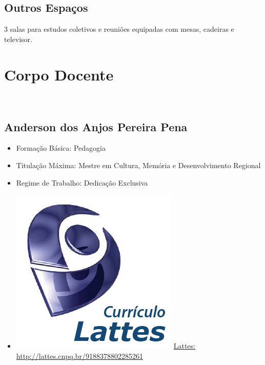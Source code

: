 \documentclass[11pt,fleqn]{book} %
\begin{document}
\section{Outros Espaços}

3 salas para estudos coletivos e reuniões equipadas com mesas, cadeiras e televisor.


\chapter{Corpo Docente}
\vspace{6em}
\begin{flushright}
	\textit{\textcolor{white}{Foto: Adriano Darosci}}
\end{flushright}
\vspace{12em}



\section{Anderson dos Anjos Pereira Pena}\label{AndersonPena}
\begin{itemize}
	\item Formação Básica: Pedagogia
	\item Titulação Máxima: Mestre em Cultura, Memória e Desenvolvimento Regional
	\item Regime de Trabalho: Dedicação Exclusiva
	\item \includegraphics[scale=.03]{Pictures/lattes}~\href{http://lattes.cnpq.br/9188378802285261}{Lattes: http://lattes.cnpq.br/9188378802285261}
\end{itemize}
\end{document}
